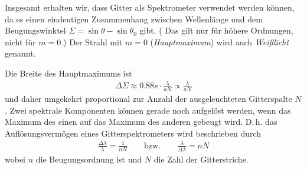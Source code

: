 \begin{enumerate}[a)]
Insgesamt erhalten wir, dass Gitter als Spektrometer verwendet werden
können, da es einen eindeutigen Zusammenhang zwischen Wellenlänge und
dem Beugungswinktel $\Sigma = \sin\theta-\sin\theta_0$ gibt.
( Das gilt nur für höhere Ordnungen, nicht für $m=0$.)
Der Strahl mit $m=0$ (\emph{Hauptmaximum}) wird
auch \emph{Weißlicht} genannt.

Die Breite des Hauptmaximums ist
\begin{gather*}
  \Delta\Sigma 
  \approx \num{0,88}s\cdot \frac{\lambda}{aN} 
  \propto \frac{\lambda}{aN} 
\end{gather*}
und daher umgekehrt proportional zur Anzahl der ausgeleuchteten
Gitterspalte $N$.
Zwei spektrale Komponenten können gerade noch aufgelöst werden, wenn
das Maximum des einen auf das Maximum des anderen gebeugt wird.
D.\,h. das Auflösungsvermögen eines Gitterspektrometers wird
beschrieben durch
\begin{gather*}
  \frac{\Delta\lambda}{\lambda} = \frac{1}{nN}
  \qquad\text{bzw.}\qquad
  \frac{\lambda}{\Delta\lambda} = nN
\end{gather*}
wobei $n$ die Beugungsordnung ist 
und $N$ die Zahl der Gitterstriche.

\end{enumerate}



